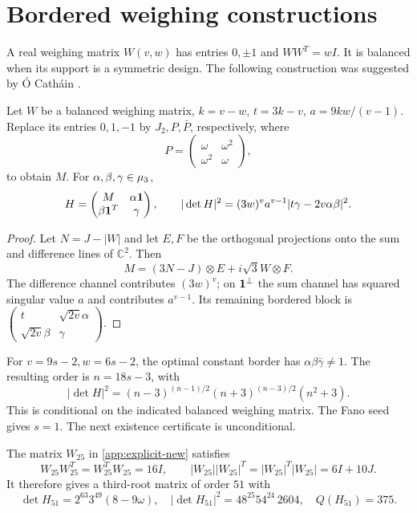 \section{Bordered weighing constructions}\label{sec:weighing-new}
A real weighing matrix $W(v,w)$ has entries $0,\pm1$ and $WW^T=wI$. It is balanced when its support is a symmetric design. The following construction was suggested by \'O Cath\'ain \cite{OCnotes}.
\begin{proposition}\label{prop:weighing-general}
Let $W$ be a balanced weighing matrix, $k=v-w$, $t=3k-v$, $a=9kw/(v-1)$. Replace its entries $0,1,-1$ by $J_2,P,\bar P$, respectively, where
\[P=\begin{pmatrix}\omega&\omega^2\\\omega^2&\omega\end{pmatrix},\]
to obtain $M$. For $\alpha,\beta,\gamma\in\mu_3$,
\[H=\begin{pmatrix}M&\alpha\mathbf1\\\beta\mathbf1^T&\gamma\end{pmatrix},\qquad
 |\det H|^2=(3w)^v a^{v-1}|t\gamma-2v\alpha\beta|^2.\]
\end{proposition}
\begin{proof}
Let $N=J-|W|$ and let $E,F$ be the orthogonal projections onto the sum and difference lines of $\mathbb C^2$. Then
\[M=(3N-J)\otimes E+i\sqrt3 W\otimes F.\]
The difference channel contributes $(3w)^v$; on $\mathbf1^\perp$ the sum channel has squared singular value $a$ and contributes $a^{v-1}$. Its remaining bordered block is
$\left(\begin{smallmatrix}t&\sqrt{2v}\alpha\\\sqrt{2v}\beta&\gamma\end{smallmatrix}\right)$.
\end{proof}
For $v=9s-2,w=6s-2$, the optimal constant border has $\alpha\beta\bar\gamma\ne1$. The resulting order is $n=18s-3$, with
\[|\det H|^2=(n-3)^{(n-1)/2}(n+3)^{(n-3)/2}(n^2+3).\]
This is conditional on the indicated balanced weighing matrix. The Fano seed gives $s=1$. The next existence certificate is unconditional.
\begin{theorem}\label{thm:bw25-new}
The matrix $W_{25}$ in \cref{app:explicit-new} satisfies
\[W_{25}W_{25}^T=W_{25}^TW_{25}=16I,\qquad
 |W_{25}||W_{25}|^T=|W_{25}|^T|W_{25}|=6I+10J.\]
It therefore gives a third-root matrix of order $51$ with
\[\det H_{51}=2^{63}3^{49}(8-9\omega),\quad
 |\det H_{51}|^2=48^{25}54^{24}\,2604,\quad Q(H_{51})=375.\]
\end{theorem}
